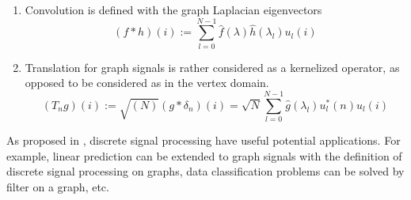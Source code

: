 \documentclass[conference]{IEEEtran}
\begin{document}
\begin{enumerate}
\item Convolution is defined with the graph Laplacian eigenvectors
$$(f*h)(i):=\sum_{l=0}^{N-1}\hat{f}(\lambda)\hat{h}(\lambda_l)u_l(i)$$

\item Translation for graph signals is rather considered as a kernelized operator, as opposed to be considered as in the vertex domain. 
$$(T_ng)(i):=\sqrt{(N)}(g*\delta_n)(i)=\sqrt N\sum_{l=0}^{N-1}\hat{g}(\lambda_l)u_l^*(n)u_l(i)$$
\end{enumerate}

As proposed in \cite{sandryhaila2013discrete1}, discrete signal processing have useful potential applications. For example, linear prediction can be extended to graph signals with the definition of discrete signal processing on graphs, data classification problems can be solved by filter on a graph, etc.
\end{document}
